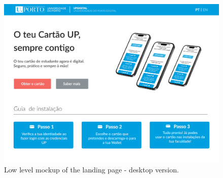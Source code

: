 \documentclass[10pt]{article}
\begin{document}
\begin{figure}[H]
  \centering
  \begin{minipage}{0.68\textwidth}
    \includegraphics[width=\linewidth]{report-images/landing-page-desktop.png}
    \caption{Low level mockup of the landing page - desktop version.}
    \label{fig:fig-8}
  \end{minipage}
  \hfill
  \begin{minipage}{0.18\textwidth}

\end{minipage}
\end{figure}
\end{document}
